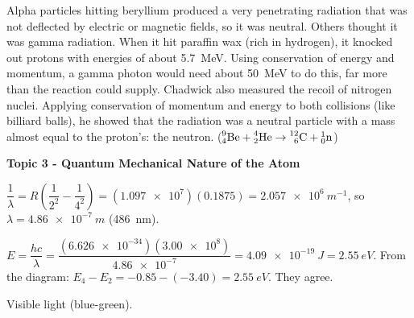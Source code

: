 \documentclass[12pt]{article}
\newcommand\anstopic[1]{\par\Needspace{8\baselineskip}\vspace{4mm}%
  \begin{center}{\headfont\bfseries\fontsize{14}{18}\selectfont #1\par}\end{center}\vspace{2pt}}
\newcommand\nuc[3]{\ensuremath{\prescript{#1}{#2}{\mathrm{#3}}}}
\begin{document}
\ansq
\begin{crit}
\end{crit}
\sample
Alpha particles hitting beryllium produced a very penetrating radiation that was not deflected by
electric or magnetic fields, so it was neutral. Others thought it was gamma radiation. When it hit
paraffin wax (rich in hydrogen), it knocked out protons with energies of about \qty{5.7}{MeV}. Using
conservation of energy and momentum, a gamma photon would need about \qty{50}{MeV} to do this, far more
than the reaction could supply. Chadwick also measured the recoil of nitrogen nuclei. Applying
conservation of momentum and energy to both collisions (like billiard balls), he showed that the radiation
was a neutral particle with a mass almost equal to the proton's: the neutron.
($\nuc{9}{4}{Be} + \nuc{4}{2}{He} \rightarrow \nuc{12}{6}{C} + \nuc{1}{0}{n}$)

\anstopic{Topic 3 - Quantum Mechanical Nature of the Atom}

\ansq
{}
\begin{crit}
\end{crit}
\sample
$\dfrac{1}{\lambda} = R\left(\dfrac{1}{2^2} - \dfrac{1}{4^2}\right) = (\num{1.097e7})(0.1875) = \qty{2.057e6}{m^{-1}}$,
so $\lambda = \qty{4.86e-7}{m}$ (\qty{486}{nm}).
\begin{crit}
\end{crit}
\sample
$E = \dfrac{hc}{\lambda} = \dfrac{(\num{6.626e-34})(\num{3.00e8})}{\num{4.86e-7}} = \qty{4.09e-19}{J}
= \qty{2.55}{eV}$. From the diagram: $E_4 - E_2 = -0.85 - (-3.40) = \qty{2.55}{eV}$. They agree.
\begin{crit}
\end{crit}
\sample
Visible light (blue-green).
\end{document}
